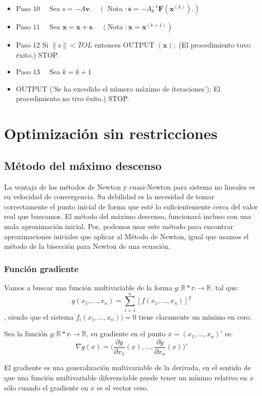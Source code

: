 \begin{itemize}
\item Paso $10 \quad$ Sea $\mathrm{s}=-A \mathbf{v} . \quad\left(\right.$ Nota $\left.: \mathbf{s}=-A_{k}^{-1} \mathbf{F}\left(\mathbf{x}^{(k)}\right) .\right)$
\item Paso $11 \quad$ Sea $\mathbf{x}=\mathbf{x}+\mathbf{s} . \quad\left(\right.$Nota $\left.: \mathbf{x}=\mathbf{x}^{(k+1)}\right)$\\
\item Paso 12 Si $\|\mathrm{s}\|<T O L$ entonces OUTPUT $(\mathbf{x}) ;$ (El procedimiento tuvo éxito.) STOP.
\item Paso $13 \quad$ Sea $k=k+1$
\item OUTPUT ('Se ha excedido el número máximo de iteraciones'); El procedimiento no tivo éxito.) STOP.
\end{itemize}


\chapter{Optimización sin restricciones}

\section{Método del máximo descenso}

La ventaja de los métodos de Newton y cuasi-Newton para sistema no lineales es su velocidad de convergencia. Su debilidad es la necesidad de tomar correctamente el punto inicial de forma que esté lo suficientemente cerca del valor real que buscamos.
El método del máximo descenso, funcionará incluso con una mala aproximación inicial. Por, podemos usar este método para encontrar aproximaciones iniciales que aplicar al Método de Newton, igual que usamos el método de la bisección para Newton de una ecuación.
\subsection{Función gradiente}
Vamos a buscar una función multivariable de la forma $g: \mathbb{R*n} \longrightarrow \mathbb{R}$. tal que:
\[g(x_1 , ... , x_n) = \sum_{i=1}^{n} [f(x_1, ... , x_n)]^2\], siendo que el sistema $f_i(x_1, ..., x_n)) = 0$ tiene claramente un mínimo en cero.

\begin{definition}
	Sea la función $g: \mathbb{R*n} \longrightarrow \mathbb{R}$, su gradiente en el punto $x = (x_1, ... , x_n)'$ es:
	\[\nabla g(x) = \Big(\frac{\partial g}{\partial x_1}(x),...,\frac{\partial g}{\partial x_n}(x)\Big)'\]
\end{definition}
El gradiente es una generalización multivariable de la derivada, en el sentido de que una función multivariable diferenciable puede tener un mínimo relativo en $x$ sólo cuando el gradiente en $x$ es el vector cero.

